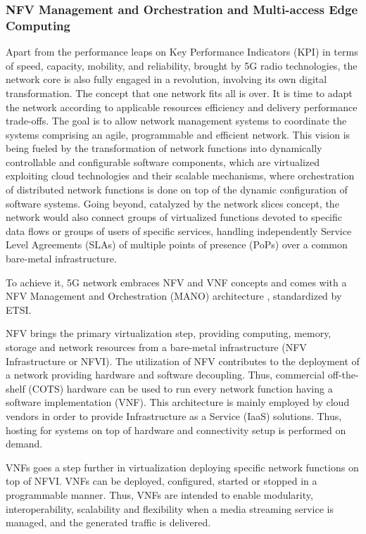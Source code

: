 \subsubsection{NFV Management and Orchestration and Multi-access Edge Computing}

Apart from the performance leaps on Key Performance Indicators (KPI) in terms of speed, capacity, mobility, and reliability, brought by 5G radio technologies, the network core is also fully engaged in a revolution, involving its own digital transformation. The concept that one network fits all is over. It is time to adapt the network according to applicable resources efficiency and delivery performance trade-offs. The goal is to allow network management systems to coordinate the systems comprising an agile, programmable and efficient network. This vision is being fueled by the transformation of network functions into dynamically controllable and configurable software components, which are virtualized exploiting cloud technologies and their scalable mechanisms, where orchestration of distributed network functions is done on top of the dynamic configuration of software systems. Going beyond, catalyzed by the network slices concept, the network would also connect groups of virtualized functions devoted to specific data flows or groups of users of specific services, handling independently Service Level Agreements (SLAs) of multiple points of presence (PoPs) over a common bare-metal infrastructure.

To achieve it, 5G network embraces NFV and VNF \cite{Liang2015} concepts and comes with a NFV Management and Orchestration (MANO) architecture \cite{ETSI2014}, standardized by ETSI.

NFV brings the primary virtualization step, providing computing, memory, storage and network resources from a bare-metal infrastructure (NFV Infrastructure or NFVI). The utilization of NFV contributes to the deployment of a network providing hardware and software decoupling. Thus, commercial off-the-shelf (COTS) hardware can be used to run every network function having a software implementation (VNF). This architecture is mainly employed by cloud vendors in order to provide Infrastructure as a Service (IaaS) solutions. Thus, hosting for systems on top of hardware and connectivity setup is performed on demand.

VNFs goes a step further in virtualization deploying specific network functions on top of NFVI.
VNFs can be deployed, configured, started or stopped in a programmable manner. Thus, VNFs are intended to enable modularity, interoperability, scalability and flexibility when a media streaming service is managed, and the generated traffic is delivered.

